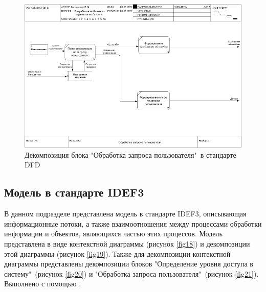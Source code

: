 \documentclass[14pt]{extreport}
\begin{document}
\begin{landscape}
\begin{figure}[H]
\centerline{\includegraphics[width=0.9\linewidth]{dfd04_A4}}
\caption{Декомпозиция блока "Обработка запроса пользователя"\ в стандарте DFD}
\label{fig17}
\end{figure}
\end{landscape}

\subsection{Модель в стандарте IDEF3}

В данном подразделе представлена модель в стандарте IDEF3, описывающая информационные потоки, а также взаимоотношения между процессами обработки информации и объектов, являющихся частью этих процессов. Модель представлена в виде контекстной диаграммы  (рисунок \ref{fig18}) и декомпозиции этой диаграммы  (рисунок \ref{fig19}). Также для декомпозиции контекстной диаграммы представлены декомпозиции блоков "Определение уровня доступа в систему"\ (рисунок \ref{fig20}) и "Обработка запроса пользователя"\ (рисунок \ref{fig21}). Выполнено с помощью \cite{bib6}.
\end{document}

